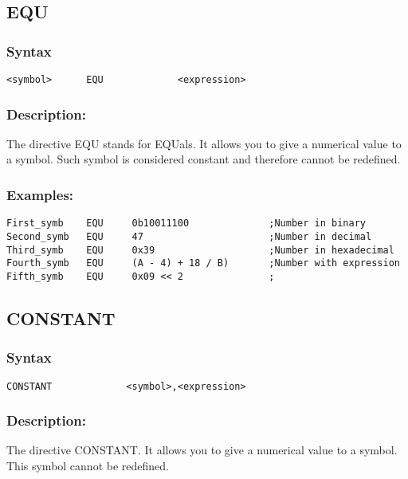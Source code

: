     \subsection{EQU}
        \subsubsection{Syntax}
            {
                \usecodefont
                \verb'<symbol>      EQU             <expression> '
            }

        \subsubsection{Description:}
            The directive EQU stands for EQUals. It allows you to give a numerical value to a symbol. Such symbol is considered constant and therefore cannot be redefined.

        \subsubsection{Examples:}
            {
                \usecodefont
                \verb'First_symb    EQU     0b10011100              ;Number in binary'\\
                \verb'Second_symb   EQU     47                      ;Number in decimal'\\
                \verb'Third_symb    EQU     0x39                    ;Number in hexadecimal'\\
                \verb'Fourth_symb   EQU     (A - 4) + 18 / B)       ;Number with expression'\\
                \verb'Fifth_symb    EQU     0x09 << 2               ;'\\
            }

    \subsection{CONSTANT}
        \subsubsection{Syntax}
            {
                \usecodefont
                \verb'CONSTANT             <symbol>,<expression>'
            }

        \subsubsection{Description:}
            The directive CONSTANT. It allows you to give a numerical value to a symbol. This symbol cannot be redefined.

